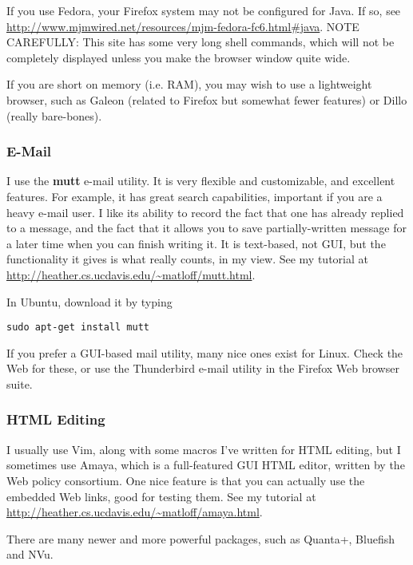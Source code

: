 \documentclass[11pt]{article}
\begin{document}
If you use Fedora, your Firefox system may not be configured for Java.
If so, see
\url{http://www.mjmwired.net/resources/mjm-fedora-fc6.html#java}.  NOTE
CAREFULLY:  This site has some very long shell commands, which will not
be completely displayed unless you make the browser window quite wide.

If you are short on memory (i.e. RAM), you may wish to use a lightweight
browser, such as Galeon (related to Firefox but somewhat fewer features)
or Dillo (really bare-bones).

\subsubsection{E-Mail}
\label{email}

I use the {\bf mutt} e-mail utility. It is very flexible and
customizable, and excellent features.  For example, it has great search
capabilities, important if you are a heavy e-mail user.  I like its
ability to record the fact that one has already replied to a message,
and the fact that it allows you to save partially-written message for a
later time when you can finish writing it.  It is text-based, not GUI,
but the functionality it gives is what really counts, in my view.  See
my tutorial at \url{http://heather.cs.ucdavis.edu/~matloff/mutt.html}. 

In Ubuntu, download it by typing

\begin{Verbatim}[fontsize=\relsize{-2}]
sudo apt-get install mutt
\end{Verbatim}

If you prefer a GUI-based mail utility, many nice ones exist for Linux.
Check the Web for these, or use the Thunderbird e-mail utility in the
Firefox Web browser suite.
 
\subsubsection{HTML Editing}

I usually use Vim, along with some macros I've written for HTML editing,
but I sometimes use Amaya, which is a full-featured GUI HTML editor,
written by the Web policy consortium.  One nice feature is that you can
actually use the embedded Web links, good for testing them.  See my
tutorial at \url{http://heather.cs.ucdavis.edu/~matloff/amaya.html}. 

There are many newer and more powerful packages, such as Quanta+,
Bluefish and NVu.
\end{document}
